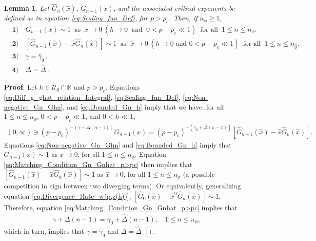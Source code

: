 \documentclass[english,12pt,jmp,graphicx]{revtex4-1}
\newtheorem{lemma}{Lemma}[section]
\newcommand{\ph}{\hat{\phi}}
\newcommand{\gh}{\hat{\gamma}}
\newcommand{\Dh}{\hat{\Delta}}
\newcommand{\xh}{\hat{x}}
\begin{document}
 \begin{lemma}\label{lem:asymp_Scaling_funs_x_to_0_p>pc}
   Let $\hat{G}_n(\xh)$, $G_{n-1}(x)$, and the associated critical
   exponents be defined as in equation \eqref{eq:Scaling_fun_Def}, for
   $p>p_c$. Then, if $n_\phi\geq1$,  
   \begin{align*}
    &\mathbf{1)} \quad G_{n-1}(x)\sim1 \ \text{ as } \ x\to0 \ (h\to0 \
    \text{ and } \ 0<p-p_c\ll1) \ \text{ for all } \ 1\leq n\leq n_\phi. \\
    &\mathbf{2)} \quad [\hat{G}_{n-1}(\xh)-\xh\hat{G}_n(\xh)]\sim1
       \ \text{ as } \ \xh\to0 \ (h\to0 \text{ and } 0<p-p_c\ll1) \ \text{ for all
         } \ 1\leq n\leq n_{\ph}.  \\
    &\mathbf{3)} \quad \gamma=\gh_0\,. \\%
    &\mathbf{4)} \quad \Delta=\Dh\,.    
   \end{align*}
 \end{lemma}
%
\noindent \textbf{Proof}:
%
Let $h\in\mathcal{U}_0\cap\mathbb{R}$ and $p>p_c.$
Equations \eqref{eq:Diff_g_ghat_relation_Integral},
\eqref{eq:Scaling_fun_Def}, 
\eqref{eq:Non-negative_Gn_Ghn}, and \eqref{eq:Bounded_Gn_h} imply that we
have, for all $1\leq n\leq n_\phi$, $0<p-p_c\ll1$, and $0<h\ll1$,    
%
\begin{align}\label{eq:Matching_Condition_Gn_Gnhat_p>pc}
  (0,\infty)\ni(p-p_c)^{-(\gamma+\Delta(n-1))}G_{n-1}(x)
       =(p-p_c)^{-(\gh_0+\Dh(n-1))}[\hat{G}_{n-1}(\xh)-\xh\hat{G}_n(\xh)].
\end{align}
%
Equations \eqref{eq:Non-negative_Gn_Ghn} and \eqref{eq:Bounded_Gn_h}
imply that $G_{n-1}(x)\sim1$ as $x\to0$, for all $1\leq n\leq n_\phi$. Equation
\eqref{eq:Matching_Condition_Gn_Gnhat_p>pc} then implies that 
$[\hat{G}_{n-1}(\xh)-\xh\hat{G}_n(\xh)]\sim1$ as $\xh\to0$,
for all $1\leq n\leq n_\phi$ (a possible competition in sign between two
diverging terms). Or equivalently, generalizing
equation \eqref{eq:Divergence_Rate_w(p,z(h))},
$[\hat{G}_0(\xh)-\xh^n\hat{G}_n(\xh)]\sim1$. Therefore, equation
\eqref{eq:Matching_Condition_Gn_Gnhat_p>pc} implies that   
%
\begin{align}
  \gamma+\Delta(n-1)=\gh_0+\Dh(n-1), \quad 1\leq n\leq n_\phi,
\end{align}
%
which in turn, implies that $\gamma=\gh_0$ and $\Delta=\Dh$ $\Box$.
\end{document}
